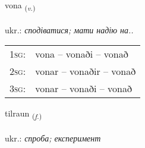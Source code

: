 \documentclass[frontgrid, backgrid]{flacards}\usepackage[]{graphicx}\usepackage[]{xcolor}
\begin{document}
\renewcommand{\flhead}{\vskip5pt \fboxsep=0pt {\small\bfseries\footnotesize Sagnorð | дієслово}}
\renewcommand{\fcfoot}{\vskip5pt \fboxsep=0pt \hspace{2pt}{\small\bfseries\footnotesize 1K}}

\renewcommand{\blhead}{\vskip5pt {\small\bfseries\footnotesize Sagnorð | дієслово }}
\renewcommand{\bcfoot}{\vskip5pt \hspace{2pt}{\small\bfseries\footnotesize 1K}}


{vona \small{\textsubscript{(\textit{v.})}} \\[1ex] %
\textphonetic{[vɔːna]} \\
ukr.: \emph{сподіватися; мати надію на..} \\  [2ex]
\renewcommand*{\arraystretch}{0.8}
\begin{tabular}{p{1cm}l}
\textsc{1sg}: & vona -- vonaði -- vonað \\ 
\textsc{2sg}: & vonar -- vonaðir -- vonað \\ 
\textsc{3sg}: & vonar -- vonaði -- vonað \\ 
\end{tabular}
}

\renewcommand{\flhead}{\vskip5pt \fboxsep=0pt {\small\bfseries\footnotesize Nafnorð | іменник}}
\renewcommand{\fcfoot}{\vskip5pt \fboxsep=0pt \hspace{2pt}{\small\bfseries\footnotesize 1K}}

\renewcommand{\blhead}{\vskip5pt {\small\bfseries\footnotesize Nafnorð | іменник }}
\renewcommand{\bcfoot}{\vskip5pt \hspace{2pt}{\small\bfseries\footnotesize 1K}}


{tilraun \small{\textsubscript{(\textit{f.})}} \\[1ex] %
\textphonetic{[tʰɪlrœin]} \\
ukr.: \emph{спроба; експеримент} \\  [2ex]
\renewcommand*{\arraystretch}{0.8}
}
\end{document}
